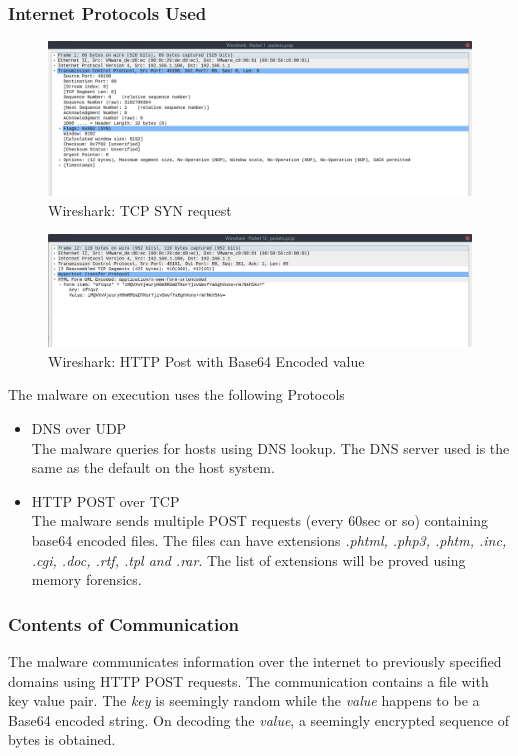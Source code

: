 \documentclass[10pt,a4paper]{article}
\begin{document}
			\subsubsection{Internet Protocols Used}
				\begin{figure}[!htbp]%
					\centering
					\includegraphics[width=\columnwidth]{pics/tcpsyn.png}
					\caption{Wireshark: TCP SYN request}
					\label{tcpsyn}
				\end{figure}
				\begin{figure}[!htbp]%
					\centering
					\includegraphics[width=\columnwidth]{pics/httppost.png}
					\caption{Wireshark: HTTP Post with Base64 Encoded value}
					\label{httppost}
				\end{figure}
				The malware on execution uses the following Protocols
				\begin{itemize}
					\item DNS over UDP\\
						The malware queries for hosts using DNS lookup.
						The DNS server used is the same as the default on the host system.
					\item HTTP POST over TCP\\
						The malware sends multiple POST requests (every 60sec or so) containing base64 encoded files.
						The files can have extensions \textit{.phtml, .php3, .phtm, .inc, .cgi, .doc, .rtf, .tpl and .rar}.
						The list of extensions will be proved using memory forensics.
				\end{itemize}
			\subsubsection{Contents of Communication}
				The malware communicates information over the internet to previously specified domains using HTTP POST
				requests. The communication contains a file with key value pair.
				The \textit{key} is seemingly random while the \textit{value} happens to be a Base64 encoded string.
				On decoding the \textit{value}, a seemingly encrypted sequence of bytes is obtained.
\end{document}
